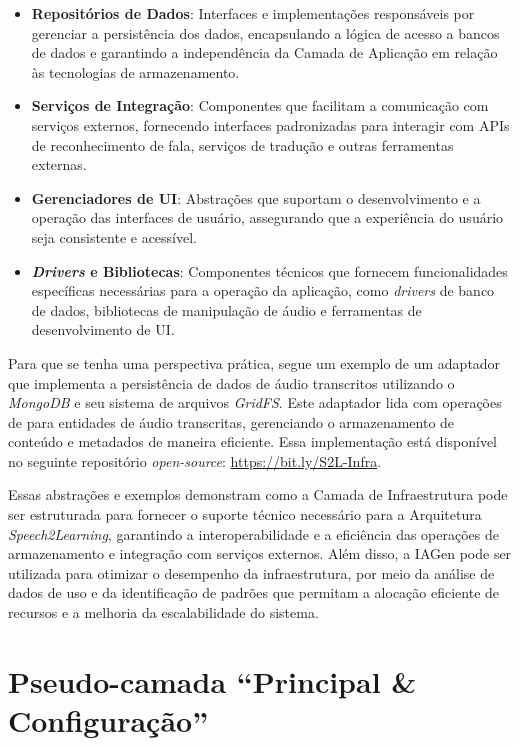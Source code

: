 \begin{itemize}
    \item \textbf{Repositórios de Dados}: Interfaces e implementações responsáveis por gerenciar a persistência dos dados, encapsulando a lógica de acesso a bancos de dados e garantindo a independência da Camada de Aplicação em relação às tecnologias de armazenamento.

    \item \textbf{Serviços de Integração}: Componentes que facilitam a comunicação com serviços externos, fornecendo interfaces padronizadas para interagir com APIs de reconhecimento de fala, serviços de tradução e outras ferramentas externas.

    \item \textbf{Gerenciadores de UI}: Abstrações que suportam o desenvolvimento e a operação das interfaces de usuário, assegurando que a experiência do usuário seja consistente e acessível.

    \item \textbf{\textit{Drivers} e Bibliotecas}: Componentes técnicos que fornecem funcionalidades específicas necessárias para a operação da aplicação, como \textit{drivers} de banco de dados, bibliotecas de manipulação de áudio e ferramentas de desenvolvimento de UI.
\end{itemize}

Para que se tenha uma perspectiva prática, segue um exemplo de um adaptador que implementa a persistência de dados de áudio transcritos utilizando o \textit{MongoDB} e seu sistema de arquivos \textit{GridFS}. Este adaptador lida com operações de  para entidades de áudio transcritas, gerenciando o armazenamento de conteúdo e metadados de maneira eficiente. Essa implementação está disponível no seguinte repositório \textit{open-source}: \url{https://bit.ly/S2L-Infra}.

Essas abstrações e exemplos demonstram como a Camada de Infraestrutura pode ser estruturada para fornecer o suporte técnico necessário para a Arquitetura \textit{Speech2Learning}, garantindo a interoperabilidade e a eficiência das operações de armazenamento e integração com serviços externos. Além disso, a IAGen pode ser utilizada para otimizar o desempenho da infraestrutura, por meio da análise de dados de uso e da identificação de padrões que permitam a alocação eficiente de recursos e a melhoria da escalabilidade do sistema.

\section{Pseudo-camada ``Principal \& Configuração''}

